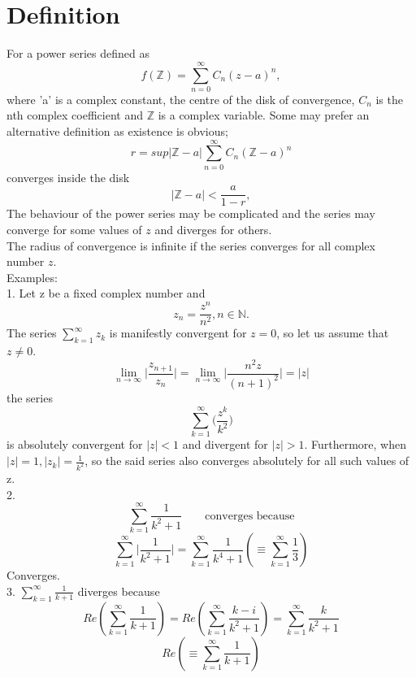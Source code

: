 \documentclass[a4paper, 12pt]{report}
\begin{document}
{\section{Definition}
For a power series  defined as 
\begin{equation*}
f(\mathbb{Z}) = \sum^{\infty}_{n=0}C_n(z - a)^n,
\end{equation*}
where 'a' is a complex constant, the centre of the disk of convergence, $C_n$ is the nth complex coefficient and $\mathbb{Z}$ is a complex variable.
Some may prefer an alternative definition as existence is obvious;
\begin{equation*}
r = sup|\mathbb{Z} - a|\sum^{\infty}_{n=0}C_n(\mathbb{Z} - a)^n
\end{equation*}
converges inside the disk
\begin{equation*}
|\mathbb{Z} - a| < \frac{a}{1 - r},
\end{equation*}
The behaviour of the power series may be complicated and the series may converge for some values of $z$ and diverges for others.\\
The radius of convergence is infinite if the series converges for all complex number $z$.\\
Examples:\\
1. Let z be a fixed complex number and 
\begin{equation*}
z_n = \frac{z^n}{n^2}, n \in \mathbb{N}.
\end{equation*}
The series $\sum^\infty_{k=1}z_k$ is manifestly convergent for $z = 0$, so let us assume that $z \neq 0$.
\begin{equation*}
\lim_{n \to \infty}\bigg|\frac{z_{n+1}}{z_n}\bigg| = \lim_{n \to \infty}\bigg|\frac{n^2z}{(n + 1)^2}\bigg| = |z|
\end{equation*}
the series
\begin{equation*}
\sum^\infty_{k=1}\bigg(\frac{z^k}{k^2}\bigg)
\end{equation*}
is absolutely convergent for $|z| < 1$ and divergent for $|z| > 1$. Furthermore, when $|z| = 1, |z_k| = \frac{1}{k^2}$, so the said series also converges absolutely for all such values of z.\\
2. 
\begin{equation*}
\sum^\infty_{k=1}\frac{1}{k^2 + 1} \qquad \text{converges because}
\end{equation*}
\begin{equation*}
\sum^\infty_{k=1}\bigg|\frac{1}{k^2 + 1}\bigg| = \sum^\infty_{k=1}\frac{1}{k^4 + 1}(\equiv \sum^\infty_{k=1}\frac{1}{3})
\end{equation*}
Converges.\\
3. $\sum^\infty_{k=1}\frac{1}{k + 1}$ diverges because
\begin{equation*}
Re(\sum^\infty_{k=1}\frac{1}{k + 1}) = Re(\sum^\infty_{k=1}\frac{k - i}{k^2 + 1}) = \sum^\infty_{k=1}\frac{k}{k^2 + 1}
\end{equation*}
\begin{equation*}
Re(\equiv\sum^\infty_{k=1}\frac{1}{k + 1})
\end{equation*}
}
\end{document}
